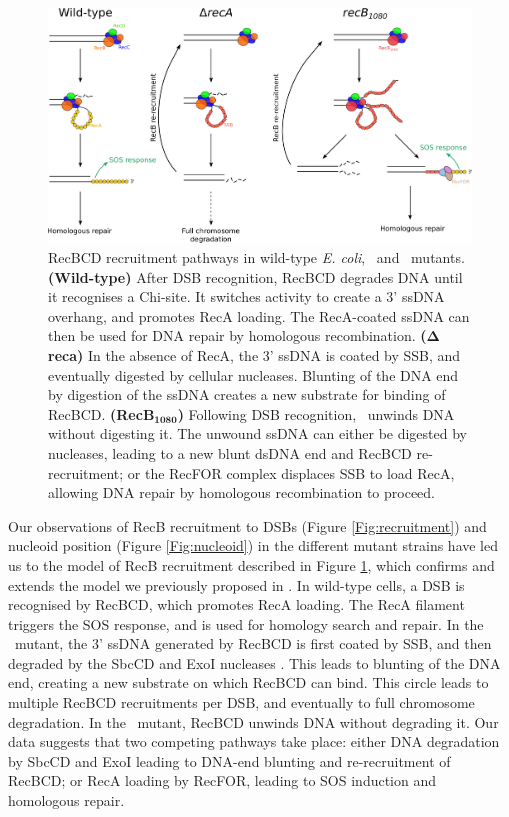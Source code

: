\begin{figure}[htbp]
    \centering
    \includegraphics[width=\textwidth]{Figures/Fig_mutants_pathways.pdf}
    \caption{RecBCD recruitment pathways in wild-type \emph{E. coli}, \dreca\ and \geneteneighty\ mutants. \textbf{(Wild-type)} After DSB recognition, RecBCD degrades DNA until it recognises a Chi-site. It switches activity to create a 3' ssDNA overhang, and promotes RecA loading. The RecA-coated ssDNA can then be used for DNA repair by homologous recombination. \textbf{($\mathbf{\Delta}$reca)} In the absence of RecA, the 3' ssDNA is coated by SSB, and eventually digested by cellular nucleases. Blunting of the DNA end by digestion of the ssDNA creates a new substrate for binding of RecBCD. \textbf{(RecB$\mathbf{_{1080}}$)} Following DSB recognition, \teneighty\ unwinds DNA without digesting it. The unwound ssDNA can either be digested by nucleases, leading to a new blunt dsDNA end and RecBCD re-recruitment; or the RecFOR complex displaces SSB to load RecA, allowing DNA repair by homologous recombination to proceed.}
    \label{Fig:pathways}
\end{figure}

Our observations of RecB recruitment to DSBs (Figure \ref{Fig:recruitment}) and nucleoid position (Figure \ref{Fig:nucleoid}) in the different mutant strains have led us to the model of RecB recruitment described in Figure \ref{Fig:pathways}, which confirms and extends the model we previously proposed in \cite{Lepore2023}. In wild-type cells, a DSB is recognised by RecBCD, which promotes RecA loading. The RecA filament triggers the SOS response, and is used for homology search and repair. In the \dreca\ mutant, the 3' ssDNA generated by RecBCD is first coated by SSB, and then degraded by the SbcCD and ExoI nucleases \cite{Zahradka2009}. This leads to blunting of the DNA end, creating a new substrate on which RecBCD can bind. This circle leads to multiple RecBCD recruitments per DSB, and eventually to full chromosome degradation. In the \geneteneighty\ mutant, RecBCD unwinds DNA without degrading it. Our data suggests that two competing pathways take place: either DNA degradation by SbcCD and ExoI leading to DNA-end blunting and re-recruitment of RecBCD; or RecA loading by RecFOR, leading to SOS induction and homologous repair.

